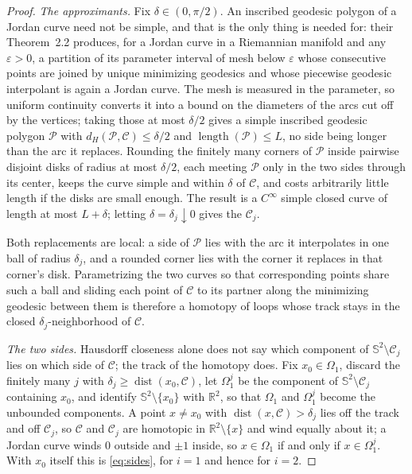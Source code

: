 \documentclass[11pt,oneside,reqno]{amsart}
\theoremstyle{plain}
\theoremstyle{definition}
\DeclareMathOperator{\dist}{dist}
\DeclareMathOperator{\length}{length}
\newcommand{\Sph}{\mathbb{S}^{2}}
\newcommand{\R}{\mathbb{R}}
\begin{document}
\begin{proof}
\emph{The approximants.} Fix $\delta\in(0,\pi/2)$. An inscribed geodesic polygon
of a Jordan curve need not be simple, and that is the only thing
\cite{BoedihardjoGeng2015} is needed for: their Theorem~2.2 produces, for a
Jordan curve in a Riemannian manifold and any $\varepsilon>0$, a partition of
its parameter interval of mesh below $\varepsilon$ whose consecutive points are
joined by unique minimizing geodesics and whose piecewise geodesic interpolant
is again a Jordan curve. The mesh is measured in the parameter, so uniform
continuity converts it into a bound on the diameters of the arcs cut off by the
vertices; taking those at most $\delta/2$ gives a simple inscribed geodesic
polygon $\mathcal{P}$ with $d_{H}(\mathcal{P},\mathcal{C})\le\delta/2$ and
$\length(\mathcal{P})\le L$, no side being longer than the arc it replaces.
Rounding the finitely many corners of $\mathcal{P}$ inside pairwise disjoint
disks of radius at most $\delta/2$, each meeting $\mathcal{P}$ only in the two
sides through its center, keeps the curve simple and within $\delta$ of
$\mathcal{C}$, and costs arbitrarily little length if the disks are small
enough. The result is a $C^{\infty}$ simple closed curve of length at most
$L+\delta$; letting $\delta=\delta_{j}\downarrow0$ gives the $\mathcal{C}_{j}$.

Both replacements are local: a side of $\mathcal{P}$ lies with the arc it
interpolates in one ball of radius $\delta_{j}$, and a rounded corner lies with
the corner it replaces in that corner's disk. Parametrizing the two curves so
that corresponding points share such a ball and sliding each point of
$\mathcal{C}$ to its partner along the minimizing geodesic between them is
therefore a homotopy of loops whose track stays in the closed
$\delta_{j}$-neighborhood of $\mathcal{C}$.

\emph{The two sides.} Hausdorff closeness alone does not say which component of
$\Sph\setminus\mathcal{C}_{j}$ lies on which side of $\mathcal{C}$; the track of
the homotopy does. Fix $x_{0}\in\Omega_{1}$, discard the finitely many $j$ with
$\delta_{j}\ge\dist(x_{0},\mathcal{C})$, let $\Omega_{1}^{j}$ be the component
of $\Sph\setminus\mathcal{C}_{j}$ containing $x_{0}$, and identify
$\Sph\setminus\{x_{0}\}$ with $\R^{2}$, so that $\Omega_{1}$ and
$\Omega_{1}^{j}$ become the unbounded components. A point $x\ne x_{0}$ with
$\dist(x,\mathcal{C})>\delta_{j}$ lies off the track and off $\mathcal{C}_{j}$,
so $\mathcal{C}$ and $\mathcal{C}_{j}$ are homotopic in $\R^{2}\setminus\{x\}$
and wind equally about it; a Jordan curve winds $0$ outside and $\pm1$ inside,
so $x\in\Omega_{1}$ if and only if $x\in\Omega_{1}^{j}$. With $x_{0}$ itself
this is \eqref{eq:sides}, for $i=1$ and hence for $i=2$.


\end{proof}
\end{document}
